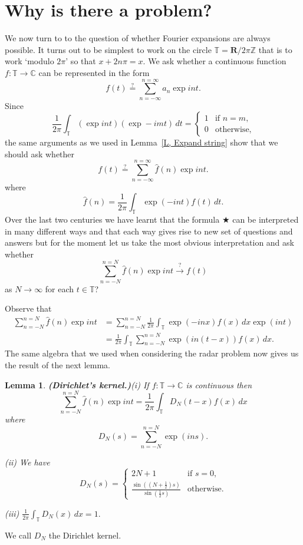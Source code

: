 \documentclass[12pt]{article}
\newtheorem{lemma}[theorem]{Lemma}
\theoremstyle{definition}
\begin{document}
\section{Why is there a problem?} We now turn to to the question
of whether Fourier expansions are always possible. It turns out
to be simplest to work on the circle 
${\mathbb T}={\mathbf R}/2\pi{\mathbb Z}$ that is to work
`modulo $2\pi$' so that $x+2n\pi=x$. We ask whether a
continuous function $f:{\mathbb T}\rightarrow{\mathbb C}$
can be represented in the form
\[f(t)\overset{?}{=}\sum_{n=-\infty}^{n=\infty}a_{n}\exp int.\]
Since
\begin{equation*}
\frac{1}{2\pi}\int_{\mathbb T}(\exp int)(\exp -imt)\,dt=
\begin{cases}1&\text{if $n=m$,}\\
0&\text{otherwise,}
\end{cases}
\end{equation*}
the same arguments as we used in Lemma~\ref{L, Expand string}
show that we should ask whether
\begin{equation}
\tag*{$\bigstar$}
f(t)\overset{?}{=}\sum_{n=-\infty}^{n=\infty}\hat{f}(n)\exp int.
\end{equation}
where
\[\hat{f}(n)=
\frac{1}{2\pi}\int_{\mathbb T}\exp(-int)f(t)\,dt.\]
Over the last two centuries we have learnt that the
formula $\bigstar$ can be interpreted in many different
ways and that each way gives rise to new set of questions
and answers but for the moment let us take the most
obvious interpretation and ask whether
\[\sum_{n=-N}^{n=N}\hat{f}(n)\exp int
\overset{?}{\rightarrow}f(t)\]
as $N\rightarrow\infty$ for each $t\in{\mathbb T}$?

Observe that
\begin{align*}
\sum_{n=-N}^{n=N}\hat{f}(n)\exp int
&=\sum_{n=-N}^{n=N}
\frac{1}{2\pi}\int_{\mathbb T}\exp(-inx)f(x)\,dx\exp(int)\\
&=\frac{1}{2\pi}\int_{\mathbb T}\sum_{n=-N}^{n=N}\exp(in(t-x))f(x)\,dx.
\end{align*}
The same algebra that we used when considering the radar problem
now gives us the result of the next lemma.
\begin{lemma}{\bf (Dirichlet's kernel.)}\label{L, Dirichlet's kernel}  
(i) If $f:{\mathbb T}\rightarrow{\mathbb C}$ is continuous then
\[\sum_{n=-N}^{n=N}\hat{f}(n)\exp int=
\frac{1}{2\pi}\int_{\mathbb T}D_{N}(t-x)f(x)\,dx\]
where
\[D_{N}(s)=\sum_{n=-N}^{n=N}\exp(ins).\]

(ii) We have
\begin{equation*}
D_{N}(s)=
\begin{cases}2N+1&\text{if $s=0$,}\\
\frac{\sin((N+\frac{1}{2})s)}{\sin(\frac{1}{2}s)}&\text{otherwise.}
\end{cases}
\end{equation*}

(iii) ${\displaystyle \frac{1}{2\pi}\int_{\mathbb T}D_{N}(x)\,dx=1.}$
\end{lemma}
We call $D_{N}$ the Dirichlet kernel.
\end{document}
